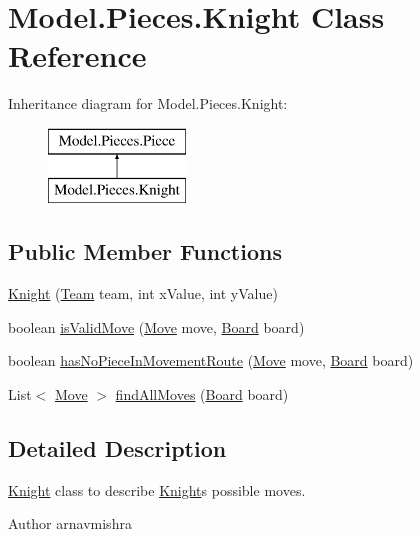 \hypertarget{class_model_1_1_pieces_1_1_knight}{}\section{Model.\+Pieces.\+Knight Class Reference}
\label{class_model_1_1_pieces_1_1_knight}
Inheritance diagram for Model.\+Pieces.\+Knight\+:\begin{figure}[H]
\begin{center}
\leavevmode
\includegraphics[height=2.000000cm]{class_model_1_1_pieces_1_1_knight}
\end{center}
\end{figure}
\subsection*{Public Member Functions}
\begin{DoxyCompactItemize}
\item 
\hyperlink{class_model_1_1_pieces_1_1_knight_a8e99ebaed34bfc3465a5d577fb0692a9}{Knight} (\hyperlink{class_model_1_1_team}{Team} team, int x\+Value, int y\+Value)
\item 
boolean \hyperlink{class_model_1_1_pieces_1_1_knight_a205e4f1df4e275380734cca239495979}{is\+Valid\+Move} (\hyperlink{class_model_1_1_move}{Move} move, \hyperlink{class_model_1_1_board}{Board} board)
\item 
boolean \hyperlink{class_model_1_1_pieces_1_1_knight_ae8502fc00e75878195898f12e8ada235}{has\+No\+Piece\+In\+Movement\+Route} (\hyperlink{class_model_1_1_move}{Move} move, \hyperlink{class_model_1_1_board}{Board} board)
\item 
List$<$ \hyperlink{class_model_1_1_move}{Move} $>$ \hyperlink{class_model_1_1_pieces_1_1_knight_ab020b621de20f10e1e9c753d9cd71342}{find\+All\+Moves} (\hyperlink{class_model_1_1_board}{Board} board)
\end{DoxyCompactItemize}


\subsection{Detailed Description}
\hyperlink{class_model_1_1_pieces_1_1_knight}{Knight} class to describe \hyperlink{class_model_1_1_pieces_1_1_knight}{Knight}\textquotesingle{}s possible moves. \begin{DoxyAuthor}{Author}
arnavmishra 
\end{DoxyAuthor}


